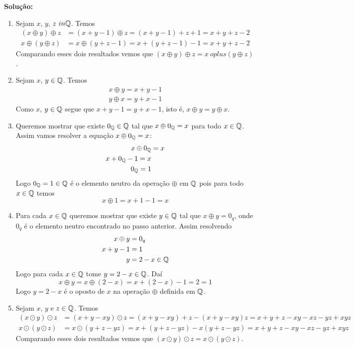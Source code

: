 \documentclass[12pt]{article}
\begin{document}
\noindent\textbf{Solu\c{c}\~ao:}
\begin{enumerate}
	\item Sejam $x$, $y$, $z \ in \mathbb{Q}$. Temos
	\begin{align*}
		(x \oplus y) \oplus z &= (x + y - 1) \oplus z = (x + y - 1) + z + 1 = x + y + z - 2\\
		x \oplus (y \oplus z) &= x \oplus (y + z - 1) = x + (y + z - 1) - 1 = x + y + z - 2
	\end{align*}
	Comparando esses dois resultados vemos que $(x \oplus y) \oplus z = x \ oplus (y \oplus z)$.

	\item Sejam $x$, $y \in \mathbb{Q}$. Temos
	\begin{align*}
		x \oplus y = x + y - 1\\
		y \oplus x = y + x - 1
	\end{align*}
	Como $x$, $y \in \mathbb{Q}$ segue que $x + y - 1 = y + x - 1$, isto é, $x \oplus y = y \oplus x$.

	\item Queremos mostrar que existe $0_{\mathbb{Q}} \in \mathbb{Q}$ tal que $x \oplus 0_{\mathbb{Q}} = x$ para todo $x \in \mathbb{Q}$.
	Assim vamos resolver a equação $x \oplus 0_{\mathbb{Q}} = x$:
	\begin{align*}
		x\oplus 0_{\mathbb{Q}} &= x\\
		x + 0_{\mathbb{Q}} - 1 = x\\
		0_{\mathbb{Q}} = 1
	\end{align*}
	Logo $0_{\mathbb{Q}} = 1 \in \mathbb{Q}$ é o elemento neutro da operação $\oplus$ em $\mathbb{Q}$ pois para todo $x \in \mathbb{Q}$ temos
	\[
		x \oplus 1 = x + 1 - 1 = x
	\]

	\item Para cada $x \in \mathbb{Q}$ queremos mostrar que existe $y \in \mathbb{Q}$ tal que $x \oplus y = 0_q$, onde $0_q$ é o elemento neutro encontrado no passo anterior. Assim resolvendo
	\begin{align*}
		x \oplus y &= 0_q\\
		x + y - 1 &= 1\\
		y &= 2 - x \in \mathbb{Q}
	\end{align*}
	Logo para cada $x \in \mathbb{Q}$ tome $y = 2 - x \in \mathbb{Q}$. Daí
	\[
		x \oplus y = x \oplus (2 - x) = x + (2 - x) - 1 = 2 = 1
	\]
	Logo $y = 2 - x$ é o oposto de $x$ na operação $\oplus$ definida em $\mathbb{Q}$.

	\item Sejam $x$, $y$ e $z \in \mathbb{Q}$. Temos
	\begin{align*}
		(x \odot y) \odot z &= (x + y - xy) \odot z = (x + y - xy) + z - (x + y - xy)z = x + y + z - xy - xz - yz + xyz\\
		x \odot (y \odot z) &= x \odot (y + z - yz) = x + (y + z - yz) - x(y + z - yz) = x + y + z - xy - xz - yz + xyz
	\end{align*}
	Comparando esses dois resultados vemos que $(x \odot y) \odot z = x \odot (y \odot z)$.


\end{enumerate}
\end{document}
